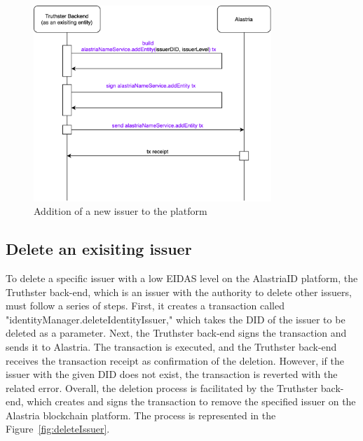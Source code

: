 \documentclass[target=mst,aauheader=]{thud}
\begin{document}
\begin{figure}
    \centering
    \includegraphics[width=0.8\textwidth]{images/addNewIssuer.png}
    \caption{Addition of a new issuer to the platform}
    \label{fig:addNewIssuer}
\end{figure}

\subsection{Delete an exisiting issuer}

To delete a specific issuer with a low EIDAS level on the AlastriaID platform, the Truthster back-end, which is an issuer with the authority to delete other issuers, must follow a series of steps. First, it creates a transaction called "identityManager.deleteIdentityIssuer," which takes the DID of the issuer to be deleted as a parameter. Next, the Truthster back-end signs the transaction and sends it to Alastria. The transaction is executed, and the Truthster back-end receives the transaction receipt as confirmation of the deletion. However, if the issuer with the given DID does not exist, the transaction is reverted with the related error. Overall, the deletion process is facilitated by the Truthster back-end, which creates and signs the transaction to remove the specified issuer on the Alastria blockchain platform.
The process is represented in the Figure~\ref{fig:deleteIssuer}.
\end{document}
